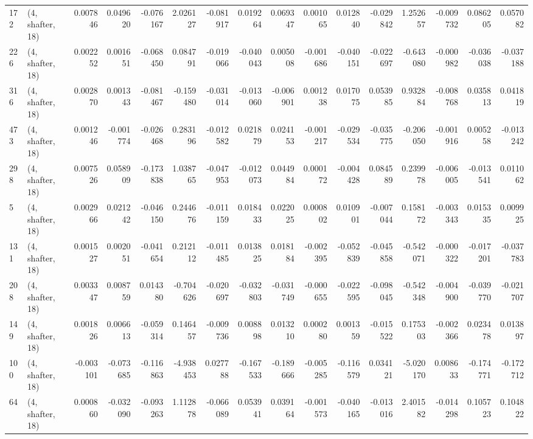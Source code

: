 \begin{tabular}{llrrrrrrrrrrrrrr}
172 &  (4, shafter, 18) &   0.007846 &  0.049620 & -0.076167 &   2.026127 & -0.081917 &   0.019264 &  0.069347 &  0.001065 &  0.012840 & -0.029842 &     1.252657 &  -0.009732 &   0.086205 &   0.057082 \\
226 &  (4, shafter, 18) &   0.002252 &  0.001651 & -0.068450 &   0.084791 & -0.019066 &  -0.040043 &  0.005008 & -0.001686 & -0.040151 & -0.022697 &    -0.643080 &  -0.000982 &  -0.036038 &  -0.037188 \\
316 &  (4, shafter, 18) &   0.002870 &  0.001343 & -0.081467 &  -0.159480 & -0.031014 &  -0.013060 & -0.006901 &  0.001238 &  0.017075 &  0.053985 &     0.932884 &  -0.008768 &   0.035813 &   0.041819 \\
473 &  (4, shafter, 18) &   0.001246 & -0.001774 & -0.026468 &   0.283196 & -0.012582 &   0.021879 &  0.024153 & -0.001217 & -0.029534 & -0.035775 &    -0.206050 &  -0.001916 &   0.005258 &  -0.013242 \\
298 &  (4, shafter, 18) &   0.007526 &  0.058909 & -0.173838 &   1.038765 & -0.047953 &  -0.012073 &  0.044984 &  0.000172 & -0.004428 &  0.084589 &     0.239978 &  -0.006005 &  -0.013541 &   0.011062 \\
5   &  (4, shafter, 18) &   0.002966 &  0.021242 & -0.046150 &   0.244676 & -0.011159 &   0.018433 &  0.022025 &  0.000802 &  0.010901 & -0.007044 &     0.158172 &  -0.003343 &   0.015335 &   0.009925 \\
131 &  (4, shafter, 18) &   0.001527 &  0.002051 & -0.041654 &   0.212112 & -0.011485 &   0.013825 &  0.018184 & -0.002395 & -0.052839 & -0.045858 &    -0.542071 &  -0.000322 &  -0.017201 &  -0.037783 \\
208 &  (4, shafter, 18) &   0.003347 &  0.008759 &  0.014380 &  -0.704626 & -0.020697 &  -0.032803 & -0.031749 & -0.000655 & -0.022595 & -0.098045 &    -0.542348 &  -0.004900 &  -0.039770 &  -0.021707 \\
149 &  (4, shafter, 18) &   0.001826 &  0.006613 & -0.059314 &   0.146457 & -0.009736 &   0.008898 &  0.013210 &  0.000280 &  0.001359 & -0.015522 &     0.175303 &  -0.002366 &   0.023478 &   0.013897 \\
100 &  (4, shafter, 18) &  -0.003101 & -0.073685 & -0.116863 &  -4.938453 &  0.027788 &  -0.167533 & -0.189666 & -0.005285 & -0.116579 &  0.034121 &    -5.020170 &   0.008633 &  -0.174771 &  -0.172712 \\
64  &  (4, shafter, 18) &   0.000860 & -0.032090 & -0.093263 &   1.112878 & -0.066089 &   0.053941 &  0.039164 & -0.001573 & -0.040165 & -0.013016 &     2.401582 &  -0.014298 &   0.105723 &   0.104822 \\

\end{tabular}
